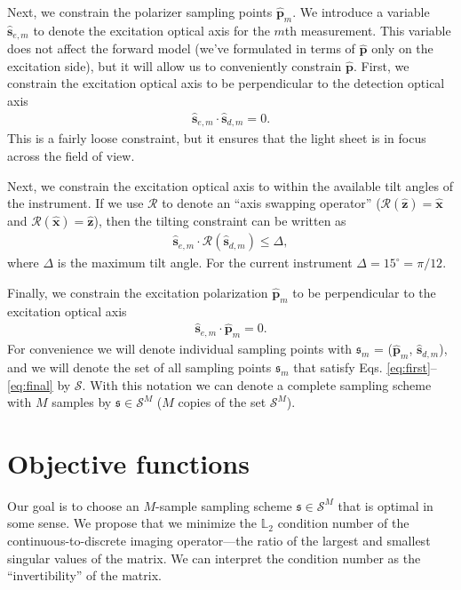 \documentclass[11pt]{article}
\providecommand{\mc}[1]{\mathcal{#1}}
\providecommand{\pp}{\mathbf{\hat{p}}}
\providecommand{\mh}[1]{\mathbf{\hat{#1}}}
\providecommand{\mf}[1]{\mathfrak{#1}}
\providecommand{\mbb}[1]{\mathbb{#1}}
\begin{document}
Next, we constrain the polarizer sampling points $\mh{p}_m$. We introduce a
variable $\mh{s}_{e,m}$ to denote the excitation optical axis for the $m$th
measurement. This variable does not affect the forward model (we've formulated
in terms of $\pp$ only on the excitation side), but it will allow us to
conveniently constrain $\pp$. First, we constrain the excitation optical axis to
be perpendicular to the detection optical axis
\begin{align}
  \mh{s}_{e,m} \cdot \mh{s}_{d,m} = 0.
\end{align}
This is a fairly loose constraint, but it ensures that the light sheet is in
focus across the field of view.

Next, we constrain the excitation optical axis to within the available tilt
angles of the instrument. If we use $\mc{R}$ to denote an ``axis swapping
operator'' ($\mc{R}(\mh{z}) = \mh{x}$ and $\mc{R}(\mh{x}) = \mh{z}$), then the tilting
constraint can be written as
\begin{align}
  \mh{s}_{e,m} \cdot \mc{R}(\mh{s}_{d,m}) \leq \Delta,
\end{align}
where $\Delta$ is the maximum tilt angle. For the current instrument $\Delta = 15^{\circ} = \pi/12$.

Finally, we constrain the excitation polarization $\pp_m$ to be perpendicular to
the excitation optical axis
\begin{align}
  \mh{s}_{e,m} \cdot \pp_m = 0.  \label{eq:final}
\end{align}
For convenience we will denote individual sampling points with $\mf{s}_m$ =
($\pp_m$, $\mh{s}_{d,m}$), and we will denote the set of all sampling points
$\mf{s}_m$ that satisfy Eqs. \eqref{eq:first}--\eqref{eq:final} by $\mc{S}$.
With this notation we can denote a complete sampling scheme with $M$ samples
by $\mf{s} \in \mc{S}^M$ ($M$ copies of the set $\mc{S}^M$).

\section{Objective functions}
Our goal is to choose an $M$-sample sampling scheme $\mf{s} \in \mc{S}^M$ that
is optimal in some sense. We propose that we minimize the $\mbb{L}_2$ condition
number of the continuous-to-discrete imaging operator---the ratio of the largest
and smallest singular values of the matrix. We can interpret the condition
number as the ``invertibility'' of the matrix.
\end{document}
